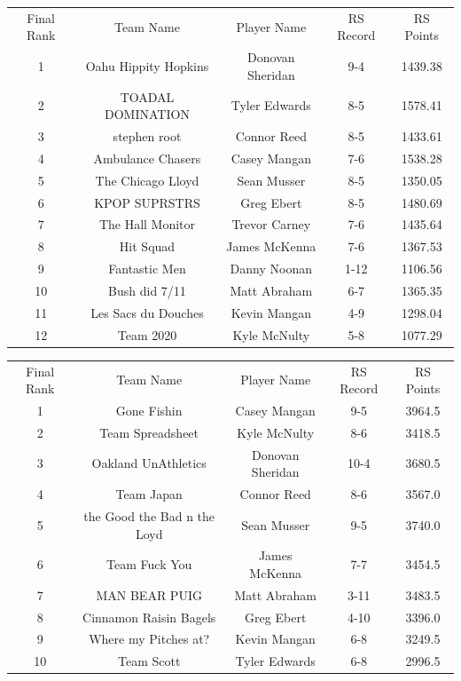 \documentclass[11pt,letterpaper]{article}
\begin{document}
\vspace{-25pt}
\begin{table} [h]
\begin{center}
\begin{tabular} { c c c c c }
\\ Final Rank & Team Name & Player Name & RS Record & RS Points
\\ 1 & Oahu Hippity Hopkins & Donovan Sheridan & 9-4 & 1439.38
\\ 2 & TOADAL DOMINATION & Tyler Edwards & 8-5 & 1578.41
\\ 3 & stephen root & Connor Reed & 8-5 & 1433.61
\\ 4 & Ambulance Chasers & Casey Mangan & 7-6 & 1538.28
\\ 5 & The Chicago Lloyd & Sean Musser & 8-5 & 1350.05
\\ 6 & KPOP SUPRSTRS & Greg Ebert & 8-5 & 1480.69
\\ 7 & The Hall Monitor & Trevor Carney & 7-6 & 1435.64
\\ 8 & Hit Squad & James McKenna & 7-6 & 1367.53
\\ 9 & Fantastic Men & Danny Noonan & 1-12 & 1106.56
\\ 10 & Bush did 7/11 & Matt Abraham & 6-7 & 1365.35
\\ 11 & Les Sacs du Douches & Kevin Mangan & 4-9 & 1298.04
\\ 12 & Team 2020 & Kyle McNulty & 5-8 & 1077.29
\end{tabular}
\end{center}
\end{table}


\newpage
{}
\vspace{-25pt}
\begin{table} [h]
\begin{center}
\begin{tabular} { c c c c c }
\\ Final Rank & Team Name & Player Name & RS Record & RS Points
\\ 1  & Gone Fishin  & Casey Mangan & 9-5  & 3964.5
\\ 2  & Team Spreadsheet  & Kyle McNulty & 8-6  & 3418.5
\\ 3  & Oakland UnAthletics  & Donovan Sheridan & 10-4  & 3680.5
\\ 4  & Team Japan  & Connor Reed & 8-6  & 3567.0
\\ 5  & the Good the Bad n the Loyd  & Sean Musser & 9-5  & 3740.0
\\ 6  & Team Fuck You  & James McKenna & 7-7  & 3454.5
\\ 7  & MAN BEAR PUIG  & Matt Abraham & 3-11  & 3483.5
\\ 8  & Cinnamon Raisin Bagels  & Greg Ebert & 4-10  & 3396.0
\\ 9  & Where my Pitches at?  & Kevin Mangan & 6-8  & 3249.5
\\ 10  & Team Scott  & Tyler Edwards & 6-8  & 2996.5
\end{tabular}
\end{center}
\end{table}
\end{document}
